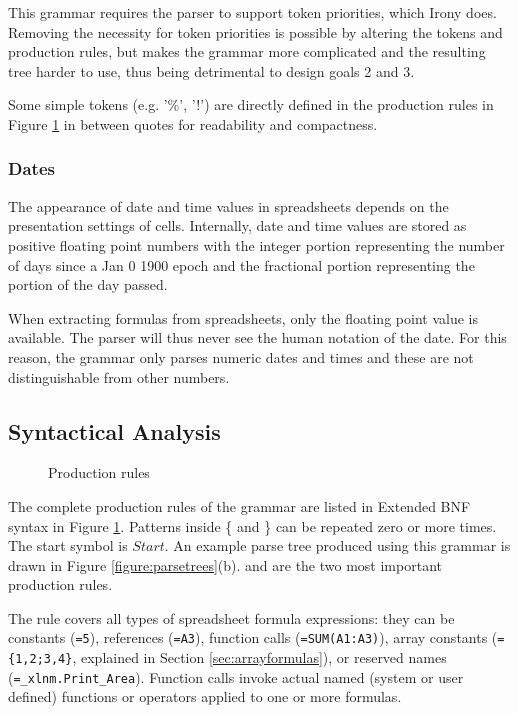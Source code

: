 This grammar requires the parser to support token priorities, which Irony does.
Removing the necessity for token priorities is possible by altering the tokens and production rules, but makes the grammar more complicated and the resulting tree harder to use, thus being detrimental to design goals 2 and 3.

Some simple tokens (e.g. '\%', '!') are directly defined in the production rules in Figure \ref{figure:productions} in between quotes for readability and compactness.

\subsubsection{\textbf{Dates}}

The appearance of date and time values in spreadsheets depends on the presentation settings of cells. Internally, date and time values are stored as positive floating point numbers with the integer portion representing the number of days since a Jan 0 1900 epoch and the fractional portion representing the portion of the day passed.

When extracting formulas from spreadsheets, only the floating point value is available.
The parser will thus never see the human notation of the date.
For this reason, the grammar only parses numeric dates and times and these are not distinguishable from other numbers.



\subsection{Syntactical Analysis}

\begin{figure}
\small
\begin{multicols*}{2}

\end{multicols*}
\caption{Production rules}
\label{figure:productions}
\end{figure}

The complete production rules of the grammar are listed in Extended BNF syntax in Figure \ref{figure:productions}.
Patterns inside \{ and \} can be repeated zero or more times.
The start symbol is $Start$. An example parse tree produced using this grammar is drawn in Figure \ref{figure:parsetrees}(b).
 and  are the two most important production rules.

The  rule covers all types of spreadsheet formula expressions: they can be constants (\texttt{=5}), references (\texttt{=A3}), function calls (\texttt{=SUM(A1:A3)}), array constants (\texttt{=\{1,2;3,4\}}, explained in Section \ref{sec:arrayformulas}), or reserved names (\texttt{=_xlnm.Print_Area}). Function calls invoke actual named (system or user defined) functions or operators applied to one or more formulas.

